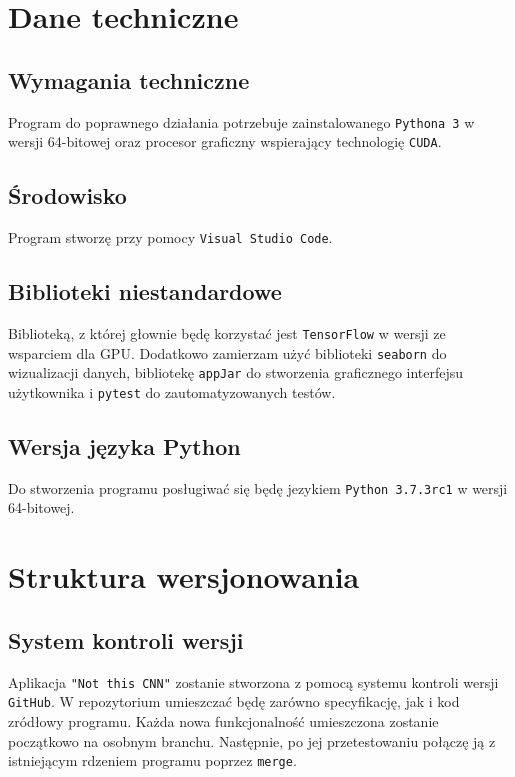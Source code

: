 \documentclass[a4paper,12pt]{article}
\begin{document}
\section{Dane techniczne}

\subsection{Wymagania techniczne}

Program do poprawnego działania potrzebuje zainstalowanego \texttt{Pythona\,3} w wersji 64-bitowej oraz procesor graficzny wspierający technologię \texttt{CUDA}.

\subsection{Środowisko}

Program stworzę przy pomocy \texttt{Visual Studio Code}.

\subsection{Biblioteki niestandardowe}

Biblioteką, z której głownie będę korzystać jest \texttt{TensorFlow} w wersji ze wsparciem dla GPU. Dodatkowo zamierzam użyć biblioteki \texttt{seaborn} do wizualizacji danych, bibliotekę \texttt{appJar} do stworzenia graficznego interfejsu użytkownika i \texttt{pytest} do zautomatyzowanych testów.

\subsection{Wersja języka Python}

Do stworzenia programu posługiwać się będę jezykiem \texttt{Python 3.7.3rc1} w wersji 64-bitowej.

\section{Struktura wersjonowania}

\subsection{System kontroli wersji}

Aplikacja \texttt{"Not this CNN"} zostanie stworzona z pomocą systemu kontroli wersji \texttt{GitHub}. W repozytorium umieszczać będę zarówno specyfikację, jak i kod zródłowy programu. Każda nowa funkcjonalność umieszczona zostanie początkowo na osobnym branchu. Następnie, po jej przetestowaniu połączę ją z istniejącym rdzeniem programu poprzez \texttt{merge}. 
\end{document}
